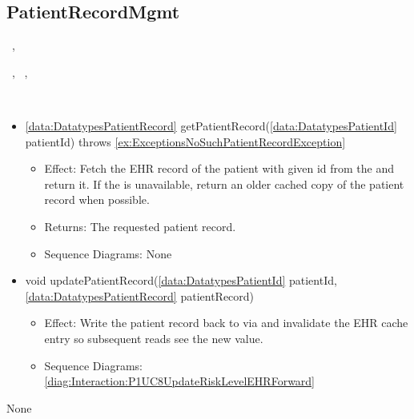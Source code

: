   \subsection{PatientRecordMgmt}\label{int:InterfacesPatientRecordMgmt}
    \begin{description}
      \item[Provided by:] \iconcomponent{}~, \iconcomponent{}~
      \item[Required by:] \iconcomponent{}~, \iconcomponent{}~, \iconcomponent{}~ 
      \item[Operations:] ~
    \begin{itemize}[noitemsep,nolistsep,leftmargin=-.25cm]
      \item \textsf{\ref{data:DatatypesPatientRecord} getPatientRecord(\ref{data:DatatypesPatientId} patientId) throws \ref{ex:ExceptionsNoSuchPatientRecordException}}
        \begin{itemize}[noitemsep,nolistsep]
           \item Effect: Fetch the EHR record of the patient with given id from the  and return it. If the  is unavailable, return an older cached copy of the patient record when possible. 
           \item Returns: The requested patient record.
           \item Sequence Diagrams: None
        \end{itemize}
      \item \textsf{void updatePatientRecord(\ref{data:DatatypesPatientId} patientId, \ref{data:DatatypesPatientRecord} patientRecord)}
        \begin{itemize}[noitemsep,nolistsep]
           \item Effect: Write the patient record back to  via  and invalidate the EHR cache entry so subsequent reads see the new value. 
           \item Sequence Diagrams: \cref{diag:Interaction:P1UC8UpdateRiskLevelEHRForward}
        \end{itemize}
    \end{itemize}
      \item[Diagrams:] None
    \end{description}

